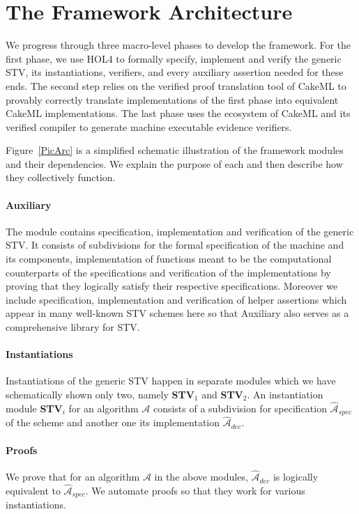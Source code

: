 \documentclass[10pt,conference]{IEEEtran}
\begin{document}
\section{The Framework Architecture}\label{sec:Arc} 
We progress through three macro-level phases to develop the framework. For the first phase, we use HOL4 to formally specify, implement and verify the generic STV, its instantiations, verifiers, and every auxiliary assertion needed for these ends. The second step relies on the verified proof translation tool of CakeML to provably correctly translate implementations of the first phase into equivalent CakeML implementations. The last phase uses the ecosystem of CakeML and its verified compiler to generate machine executable evidence verifiers.   


Figure~\ref{PicArc} is a simplified schematic illustration of the framework modules and their dependencies. We explain the purpose of each and then describe how they collectively function.

\paragraph*{\textbf{Auxiliary}} The module contains specification, implementation and verification of the generic STV. It consists of subdivisions for the formal specification of the machine and its components, implementation of functions meant to be the computational counterparts of the specifications and verification of the implementations by proving that they logically satisfy their respective specifications. Moreover we include specification, implementation and verification of helper assertions which appear in many well-known STV schemes here so that Auxiliary also serves as a comprehensive library for STV. 
\paragraph*{\textbf{Instantiations}}
  Instantiations of the generic STV happen in separate modules which we have schematically shown only two, namely   \textbf{STV}$_{1}$ and \textbf{STV}$_{2}$. An instantiation module \textbf{STV}$_{i}$ for an algorithm $\mathcal{A}$ consists of a subdivision for specification $\hat{\mathcal{A}}_{spec}$ of  the scheme and another one its implementation $\hat{\mathcal{A}}_{dec}$. 
\paragraph*{\textbf{Proofs}} We prove that for an algorithm $\mathcal{A}$ in the above modules,  $\hat{\mathcal{A}}_{dec}$ is logically equivalent to $\hat{\mathcal{A}}_{spec}$. We automate proofs so that they work for various instantiations. 
\end{document}
